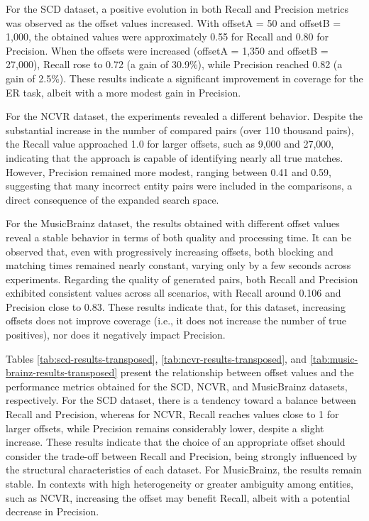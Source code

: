 \documentclass{ieeeaccess}
\begin{document}
For the SCD dataset, a positive evolution in both Recall and Precision metrics was observed as the offset values increased. With offsetA = 50 and offsetB = 1,000, the obtained values were approximately 0.55 for Recall and 0.80 for Precision. When the offsets were increased (offsetA = 1,350 and offsetB = 27,000), Recall rose to 0.72 (a gain of 30.9\%), while Precision reached 0.82 (a gain of 2.5\%). These results indicate a significant improvement in coverage for the ER task, albeit with a more modest gain in Precision.

For the NCVR dataset, the experiments revealed a different behavior. Despite the substantial increase in the number of compared pairs (over 110 thousand pairs), the Recall value approached 1.0 for larger offsets, such as 9,000 and 27,000, indicating that the approach is capable of identifying nearly all true matches. However, Precision remained more modest, ranging between 0.41 and 0.59, suggesting that many incorrect entity pairs were included in the comparisons, a direct consequence of the expanded search space.

For the MusicBrainz dataset, the results obtained with different offset values reveal a stable behavior in terms of both quality and processing time. It can be observed that, even with progressively increasing offsets, both blocking and matching times remained nearly constant, varying only by a few seconds across experiments. Regarding the quality of generated pairs, both Recall and Precision exhibited consistent values across all scenarios, with Recall around 0.106 and Precision close to 0.83. These results indicate that, for this dataset, increasing offsets does not improve coverage (i.e., it does not increase the number of true positives), nor does it negatively impact Precision.

Tables \ref{tab:scd-results-transposed}, \ref{tab:ncvr-results-transposed}, and \ref{tab:music-brainz-results-transposed} present the relationship between offset values and the performance metrics obtained for the SCD, NCVR, and MusicBrainz datasets, respectively. For the SCD dataset, there is a tendency toward a balance between Recall and Precision, whereas for NCVR, Recall reaches values close to 1 for larger offsets, while Precision remains considerably lower, despite a slight increase. These results indicate that the choice of an appropriate offset should consider the trade-off between Recall and Precision, being strongly influenced by the structural characteristics of each dataset. For MusicBrainz, the results remain stable. In contexts with high heterogeneity or greater ambiguity among entities, such as NCVR, increasing the offset may benefit Recall, albeit with a potential decrease in Precision.
\end{document}
